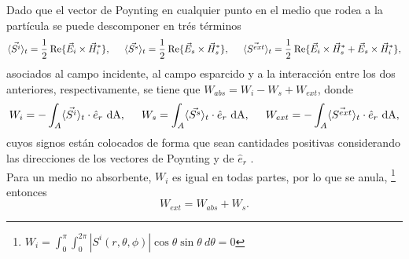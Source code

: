  Dado que el vector de Poynting en cualquier punto en el medio que rodea a la partícula se puede descomponer en trés términos \cite{Bohren}
 \begin{equation}
 \langle\Vec{S^i}\rangle_t=  \frac{1}{2}\:\mbox{Re}\{\Vec{E}_i\times\Vec{H}_i^*\}  ,\hspace{0.5cm} \langle\Vec{S^s}\rangle_t=  \frac{1}{2}\:\mbox{Re}\{\Vec{E}_s\times\Vec{H}_s^*\},\hspace{0.5cm} 	\langle\Vec{S^{ext}}\rangle_t= \frac{1}{2}\:\mbox{Re}\{\Vec{E}_i\times\Vec{H}_s^*+\Vec{E}_s\times\Vec{H}_i^*\},
 	\label{S}
 \end{equation}
 asociados al campo incidente, al campo esparcido y a la interacción entre los dos anteriores, respectivamente, se tiene que $W_{abs}=W_i-W_s+W_{ext}$, donde \cite{Bohren}
 \begin{equation}
 	W_i  = -\int_{A}\langle\Vec{S^i}\rangle_t\cdot\hat{e}_r\text{ dA},\hspace{0.5cm} W_s=\int_{A}\langle\Vec{S^s}\rangle_t\cdot\hat{e}_r\text{ dA},\hspace{0.5cm} 	W_{ext} = -\int_{A}\langle\Vec{S^{ext}}\rangle_t\cdot\hat{e}_r\text{ dA},
 	\label{Ws}
 \end{equation}
 cuyos signos están colocados de forma que sean cantidades positivas considerando las direcciones de los vectores de Poynting y de $\hat{e}_r$ .\\
 
\noindent Para un medio no absorbente, $W_i$ es igual en todas partes, por lo que se anula, \footnote{$W_i =\int_{0}^{\pi}\int_{0}^{2\pi}|S^i(r,\theta,\phi)|\cos\theta \sin\theta \: d\theta=0$} entonces
\begin{equation}
	W_{ext}=W_{abs}+W_s.
\end{equation}


